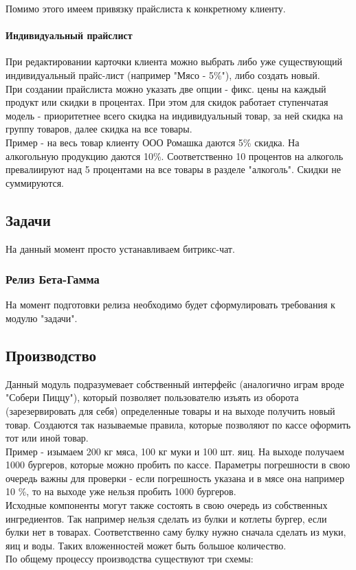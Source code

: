 \documentclass[DIV=calc, paper=a4, fontsize=11pt]{scrartcl} %
\begin{document}
Помимо этого имеем привязку прайслиста к конкретному клиенту.

\paragraph{Индивидуальный прайслист}

При редактировании карточки клиента можно выбрать либо уже существующий индивидуальный прайс-лист (например "Мясо - 5\%"), либо создать новый.
\\[0.5cm]
При создании прайслиста можно указать две опции - фикс. цены на каждый продукт или скидки в процентах. При этом для скидок работает ступенчатая модель - приоритетнее всего скидка на индивидуальный товар, за ней скидка на группу товаров, далее скидка на все товары.
\\[0.5cm]
Пример - на весь товар клиенту ООО Ромашка даются 5\% скидка. На алкогольную продукцию даются 10\%. Соответственно 10 процентов на алкоголь превалиируют над 5 процентами на все товары в разделе "алкоголь". Скидки не суммируются.

\subsection{Задачи}

На данный момент просто устанавливаем битрикс-чат.

\subsubsection{Релиз Бета-Гамма}
На момент подготовки релиза необходимо будет сформулировать требования к модулю "задачи".

\subsection{Производство}

Данный модуль подразумевает собственный интерфейс (аналогично играм вроде "Собери Пиццу"), который позволяет пользователю изъять из оборота (зарезервировать для себя) определенные товары и на выходе получить новый товар. Создаются так называемые правила, которые позволяют по кассе оформить тот или иной товар.
\\[0.5cm]
Пример - изымаем 200 кг мяса, 100 кг муки и 100 шт. яиц. На выходе получаем 1000 бургеров, которые можно пробить по кассе. Параметры погрешности в свою очередь важны для проверки - если погрешность указана и в мясе она например 10 \%, то на выходе уже нельзя пробить 1000 бургеров.
\\[0.5cm]
Исходные компоненты могут также состоять в свою очередь из собственных ингредиентов. Так например нельзя сделать из булки и котлеты бургер, если булки нет в товарах. Соответственно саму булку нужно сначала сделать из муки, яиц и воды. Таких вложенностей может быть большое количество.
\\[0.5cm]
По общему процессу производства существуют три схемы:
\end{document}
